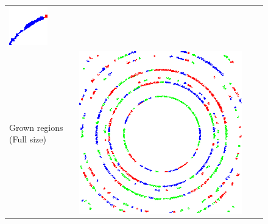 \documentclass[preprint]{iucr}              %
\begin{document}
\begin{figure}
\begin{tabular}{>{\centering\arraybackslash}m{.1\linewidth}>{\centering\arraybackslash}m{.25\linewidth}>{\centering\arraybackslash}m{.25\linewidth}>{\centering\arraybackslash}m{.25\linewidth}}
\includegraphics[width=\linewidth]{Detail/o_max1_Regs_Zin_thin.png}
\\
Grown regions (Full size)&
\includegraphics[width=\linewidth]{Detail/o_max1_Regs_aftr_norSmooth.png}& &

\end{tabular}
\end{figure}
\end{document}
